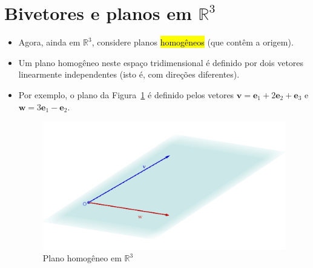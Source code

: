 \documentclass[
  letterpaper,
  DIV=11,
  numbers=noendperiod]{scrreprt}
\begin{document}
\hypertarget{bivetores-e-planos-em-mathbbr3}{%
\section{\texorpdfstring{Bivetores e planos em
$\mathbb{R}^3$}{Bivetores e planos em }}\label{bivetores-e-planos-em-mathbbr3}}

\begin{itemize}
\item
  Agora, ainda em $\mathbb{R}^3$, considere planos {\hl{homogêneos}}
  (que contêm a origem).
\item
  Um plano homogêneo neste espaço tridimensional é definido por dois
  vetores linearmente independentes (isto é, com direções diferentes).
\item
  Por exemplo, o plano da Figura~\ref{fig-plano} é definido pelos
  vetores
  $\mathbf{v} = \mathbf{e}_{1} + 2\mathbf{e}_{2} + \mathbf{e}_{3}$ e
  $\mathbf{w} = 3\mathbf{e}_{1} - \mathbf{e}_{2}$.

  \begin{figure}[t]

  {\centering \includegraphics[width=1\textwidth,height=\textheight]{figures/plano.jpg}

  }

  \caption{\label{fig-plano}Plano homogêneo em $\mathbb{R}^3$}


\end{figure}
\end{itemize}
\end{document}
